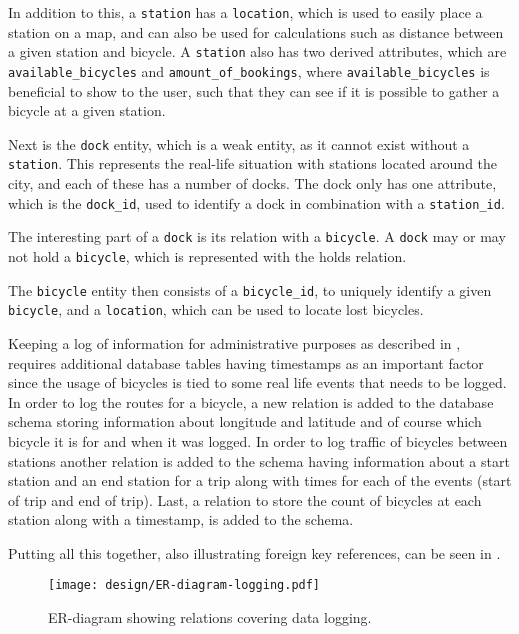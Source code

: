 In addition to this, a \texttt{station} has a \texttt{location}, which is used to easily place a station on a map, and can also be used for calculations such as distance between a given station and bicycle.
A \texttt{station} also has two derived attributes, which are \texttt{available_bicycles} and \texttt{amount_of_bookings}, where \texttt{available_bicycles} is beneficial to show to the user, such that they can see if it is possible to gather a bicycle at a given station.

Next is the \texttt{dock} entity, which is a weak entity, as it cannot exist without a \texttt{station}.
This represents the real-life situation with stations located around the city, and each of these has a number of docks.
The dock only has one attribute, which is the \texttt{dock_id}, used to identify a dock in combination with a \texttt{station_id}.

The interesting part of a \texttt{dock} is its relation with a \texttt{bicycle}.
A \texttt{dock} may or may not hold a \texttt{bicycle}, which is represented with the holds relation.

The \texttt{bicycle} entity then consists of a \texttt{bicycle_id}, to uniquely identify a given \texttt{bicycle}, and a \texttt{location}, which can be used to locate lost bicycles.

Keeping a log of information for administrative purposes as described in , requires additional database tables having timestamps as an important factor since the usage of bicycles is tied to some real life events that needs to be logged. 
In order to log the routes for a bicycle, a new relation is added to the database schema storing information about longitude and latitude and of course which bicycle it is for and when it was logged.
In order to log traffic of bicycles between stations another relation is added to the schema having information about a start station and an end station for a trip along with times for each of the events (start of trip and end of trip).
Last, a relation to store the count of bicycles at each station along with a timestamp, is added to the schema.

Putting all this together, also illustrating foreign key references, can be seen in .

\begin{figure}
\texttt{[image: design/ER-diagram-logging.pdf]}
\vspace*{-2cm}
\caption{ER-diagram showing relations covering data logging.}\label{fig:er-dia-log}
\end{figure}

